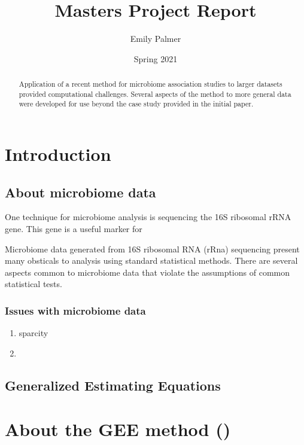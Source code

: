 \documentclass[12pt]{article}
\title{Masters Project Report}
\author{Emily Palmer}
\date{Spring 2021}
\begin{document}
\maketitle

\begin{abstract}
  Application of a recent method for microbiome association studies to larger datasets provided computational challenges. Several aspects of the method to more general data were developed for use beyond the case study provided in the initial paper.
\end{abstract}


\tableofcontents



\section{Introduction}

\subsection{About microbiome data}

One technique for microbiome analysis is sequencing the 16S ribosomal rRNA gene. This gene is a useful marker for




Microbiome data generated from 16S ribosomal RNA (rRna) sequencing present many obsticals to analysis using standard statistical methods. There are several aspects common to microbiome data that violate the assumptions of common statistical tests.

\subsubsection{Issues with microbiome data}
\begin{enumerate}
  \item sparcity
  \item
\end{enumerate}


\subsection{Generalized Estimating Equations}
\cite{chen2020generalized}

\section{About the GEE method ()}
\end{document}
